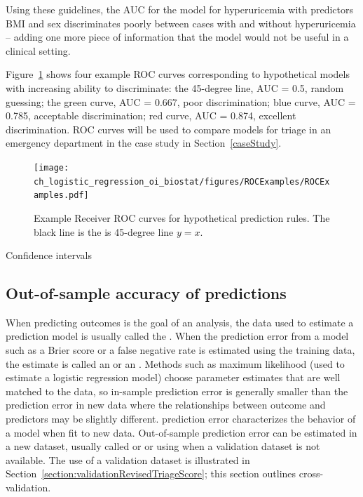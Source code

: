 Using these guidelines, the AUC for the model for hyperuricemia with predictors BMI and sex discriminates poorly between cases with and without hyperuricemia -- adding one more piece of information that the model would not be useful in a clinical setting.

Figure~\ref{figure:ROCExamples} shows four example ROC curves corresponding to hypothetical models with increasing ability to discriminate: the 45-degree line, AUC = 0.5, random guessing; the green curve, AUC = 0.667, poor discrimination; blue curve, AUC = 0.785, acceptable discrimination; red curve, AUC = 0.874, excellent discrimination. ROC curves will be used to compare models for triage in an emergency department in the case study in Section~\ref{caseStudy}.

\begin{figure}[!tbh]
  \centering
  \texttt{[image: ch\_logistic\_regression\_oi\_biostat/figures/ROCExamples/ROCExamples.pdf]}
    \caption{Example Receiver ROC curves for hypothetical prediction rules. The black line is the is 45-degree line $y = x$.}
    \label{figure:ROCExamples}
\end{figure}

Confidence intervals

\subsection{Out-of-sample accuracy of predictions}
\label{section:outOfSamplePredictionAccuracy} 

When predicting outcomes is the goal of an analysis, the data used to estimate a prediction model is usually called the . When the prediction error from a model such as a Brier score or a false negative rate is estimated using the training data, the estimate is called an  or an . Methods such as maximum likelihood (used to estimate a logistic regression model) choose parameter estimates that are well matched to the data, so in-sample prediction error is generally smaller than the prediction error in new data where the relationships between outcome and predictors may be slightly different.   prediction error characterizes the behavior of a model when fit to new data.  Out-of-sample prediction error can be estimated in a new dataset, usually called  or  or using  when a validation dataset is not available.  The use of a validation dataset is illustrated in Section~\ref{section:validationRevisedTriageScore}; this section outlines cross-validation. 

